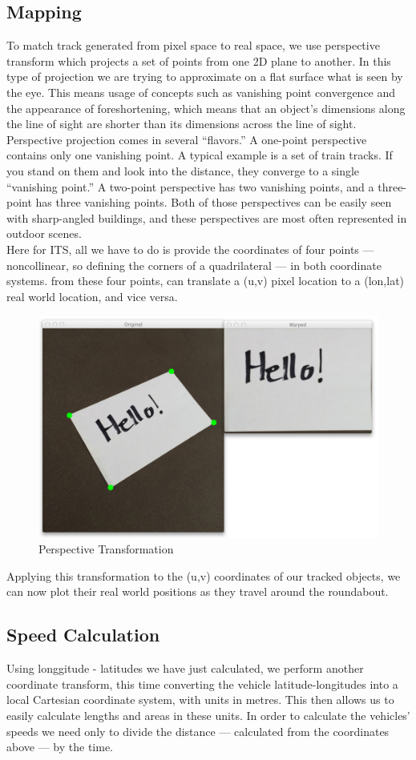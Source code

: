     \subsection{Mapping}
        To match track generated from pixel space to real space, we use perspective transform which projects a set of points from one 2D plane to another. 
        In this type of projection we are trying to approximate on a flat surface what is seen by the eye. This means usage of concepts such as vanishing 
        point convergence and the appearance of foreshortening, which means that an object's dimensions along the line of sight are shorter than its dimensions across the line of sight. \\ 
        \vspace{3mm}
        Perspective projection comes in several “flavors.” A one-point perspective contains only one vanishing point. A typical example is a set of train tracks. 
        If you stand on them and look into the distance, they converge to a single “vanishing point.” A two-point perspective has two vanishing points, 
        and a three-point has three vanishing points. Both of those  perspectives can be easily seen with sharp-angled buildings, and these perspectives are most often represented in outdoor scenes. \\ 
        \vspace{3mm}
        Here for ITS, all we have to do is provide the coordinates of four points — noncollinear, so defining the corners of a quadrilateral — in both coordinate systems. from these four points, 
        can translate a (u,v) pixel location to a (lon,lat) real world location, and vice versa. 
        \begin{figure}[H]
            \centering
            \includegraphics[width=0.6\linewidth]{img/perspective.png}
            \caption{Perspective Transformation}
        \end{figure}
        Applying this transformation to the (u,v) coordinates of our tracked objects, we can now plot their real world positions as they travel around the roundabout.
    \subsection{Speed Calculation}
        Using longgitude - latitudes we have just calculated, we perform another coordinate transform, this time converting the vehicle latitude-longitudes into a local Cartesian coordinate system, 
        with units in metres. This then allows us to easily calculate lengths and areas in these units. In order to calculate the vehicles’ speeds we need only to divide the distance — 
        calculated from the coordinates above — by the time.